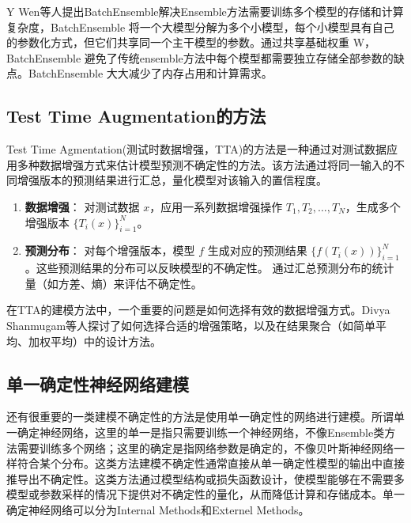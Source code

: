 Y Wen\cite{wen2020batchensemble}等人提出BatchEnsemble解决Ensemble方法需要训练多个模型的存储和计算复杂度，BatchEnsemble 将一个大模型分解为多个小模型，每个小模型具有自己的参数化方式，但它们共享同一个主干模型的参数。通过共享基础权重 W，BatchEnsemble 避免了传统ensemble方法中每个模型都需要独立存储全部参数的缺点。BatchEnsemble 大大减少了内存占用和计算需求。




\subsection{Test Time Augmentation的方法}
Test Time Agmentation(测试时数据增强，TTA)的方法是一种通过对测试数据应用多种数据增强方式来估计模型预测不确定性的方法。该方法通过将同一输入的不同增强版本的预测结果进行汇总，量化模型对该输入的置信程度。


\begin{enumerate}
    \item \textbf{数据增强}：
    对测试数据 \( x \)，应用一系列数据增强操作 \( T_1, T_2, \ldots, T_N \)，生成多个增强版本 \( \{ T_i(x) \}_{i=1}^N \)。

    \item \textbf{预测分布}：
    对每个增强版本，模型 \( f \) 生成对应的预测结果 \( \{ f(T_i(x)) \}_{i=1}^N \)。这些预测结果的分布可以反映模型的不确定性。
    通过汇总预测分布的统计量（如方差、熵）来评估不确定性。
\end{enumerate}

在TTA的建模方法中，一个重要的问题是如何选择有效的数据增强方式。Divya Shanmugam等人\cite{shanmugam2020and}探讨了如何选择合适的增强策略，以及在结果聚合（如简单平均、加权平均）中的设计方法。




\subsection{单一确定性神经网络建模}
还有很重要的一类建模不确定性的方法是使用单一确定性的网络进行建模。所谓单一确定神经网络，这里的单一是指只需要训练一个神经网络，不像Ensemble类方法需要训练多个网络；这里的确定是指网络参数是确定的，不像贝叶斯神经网络一样符合某个分布。这类方法建模不确定性通常直接从单一确定性模型的输出中直接推导出不确定性。这类方法通过模型结构或损失函数设计，使模型能够在不需要多模型或参数采样的情况下提供对不确定性的量化，从而降低计算和存储成本。单一确定神经网络可以分为Internal Methods和Externel Methods\cite{gawlikowski2023survey}。

